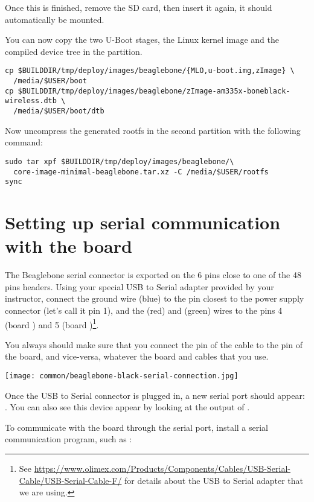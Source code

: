 Once this is finished, remove the SD card, then insert it again, it
should automatically be mounted.

You can now copy the two U-Boot stages, the Linux kernel image and the compiled
device tree in the  partition.
\begin{verbatim}
cp $BUILDDIR/tmp/deploy/images/beaglebone/{MLO,u-boot.img,zImage} \
  /media/$USER/boot
cp $BUILDDIR/tmp/deploy/images/beaglebone/zImage-am335x-boneblack-wireless.dtb \
  /media/$USER/boot/dtb
\end{verbatim}

Now uncompress the generated rootfs in the second partition with the
following  command:
\begin{verbatim}
sudo tar xpf $BUILDDIR/tmp/deploy/images/beaglebone/\
  core-image-minimal-beaglebone.tar.xz -C /media/$USER/rootfs
sync
\end{verbatim}

\section{Setting up serial communication with the board}

The Beaglebone serial connector is exported on the 6 pins close to one
of the 48 pins headers. Using your special USB to Serial adapter provided
by your instructor, connect the ground wire (blue) to the pin closest
to the power supply connector (let's call it pin 1), and the \code{TX} (red)
and \code{RX} (green) wires to the pins 4 (board \code{RX}) and
5 (board \code{TX})\footnote{See
\url{https://www.olimex.com/Products/Components/Cables/USB-Serial-Cable/USB-Serial-Cable-F/}
for details about the USB to Serial adapter that we are using.}.

You always should make sure that you connect the \code{TX} pin of the cable
to the \code{RX} pin of the board, and vice-versa, whatever the board and
cables that you use.

\begin{center}
\texttt{[image: common/beaglebone-black-serial-connection.jpg]}
\end{center}

Once the USB to Serial connector is plugged in, a new serial port
should appear: .  You can also see this device
appear by looking at the output of .

To communicate with the board through the serial port, install a
serial communication program, such as :

